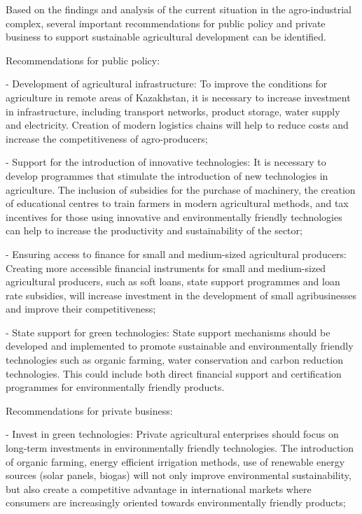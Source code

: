 \begin{multicols}{2}
Based on the findings and analysis of the current situation in the
agro-industrial complex, several important recommendations for public
policy and private business to support sustainable agricultural
development can be identified.

Recommendations for public policy:

- Development of agricultural infrastructure: To improve the conditions
for agriculture in remote areas of Kazakhstan, it is necessary to
increase investment in infrastructure, including transport networks,
product storage, water supply and electricity. Creation of modern
logistics chains will help to reduce costs and increase the
competitiveness of agro-producers;

- Support for the introduction of innovative technologies: It is
necessary to develop programmes that stimulate the introduction of new
technologies in agriculture. The inclusion of subsidies for the purchase
of machinery, the creation of educational centres to train farmers in
modern agricultural methods, and tax incentives for those using
innovative and environmentally friendly technologies can help to
increase the productivity and sustainability of the sector;

- Ensuring access to finance for small and medium-sized agricultural
producers: Creating more accessible financial instruments for small and
medium-sized agricultural producers, such as soft loans, state support
programmes and loan rate subsidies, will increase investment in the
development of small agribusinesses and improve their competitiveness;

- State support for green technologies: State support mechanisms should
be developed and implemented to promote sustainable and environmentally
friendly technologies such as organic farming, water conservation and
carbon reduction technologies. This could include both direct financial
support and certification programmes for environmentally friendly
products.

Recommendations for private business:

- Invest in green technologies: Private agricultural enterprises should
focus on long-term investments in environmentally friendly technologies.
The introduction of organic farming, energy efficient irrigation
methods, use of renewable energy sources (solar panels, biogas) will not
only improve environmental sustainability, but also create a competitive
advantage in international markets where consumers are increasingly
oriented towards environmentally friendly products;


\end{multicols}
